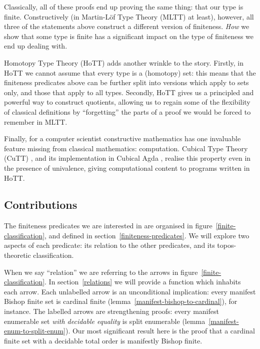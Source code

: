 Classically, all of these proofs end up proving the same thing: that our type is
finite.
Constructively (in Martin-Löf Type Theory (MLTT)
\cite{martin-lofIntuitionisticTypeTheory1980} at least), however, all three
of the statements above construct a different version of finiteness.
\emph{How} we show that some type is finite has a significant impact on the
type of finiteness we end up dealing with.

Homotopy Type Theory (HoTT) \cite{hottbook} adds another wrinkle to the story.
Firstly, in HoTT we cannot assume that every type is a (homotopy) set: this
means that the finiteness predicates above can be further split into versions
which apply to sets only, and those that apply to all types.
Secondly, HoTT gives us a principled and powerful way to construct quotients,
allowing us to regain some of the flexibility of classical definitions by
``forgetting'' the parts of a proof we would be forced to remember in MLTT.

Finally, for a computer scientist constructive mathematics has one invaluable
feature missing from classical mathematics: computation.
Cubical Type Theory (CuTT) \cite{cohenCubicalTypeTheory2016}, and its
implementation in Cubical Agda \cite{vezzosiCubicalAgdaDependently2019}, realise
this property even in the presence of univalence, giving computational content
to programs written in HoTT.
\subsection{Contributions}
The finiteness predicates we are interested in are organised in
figure~\ref{finite-classification}, and defined in
section~\ref{finiteness-predicates}.
We will explore two aspects of each predicate: its relation to the other
predicates, and its topos-theoretic classification.



When we say ``relation'' we are referring to the arrows in
figure~\ref{finite-classification}.
In section~\ref{relations} we will provide a function which inhabits each arrow.
Each unlabelled arrow is an unconditional implication: every manifest Bishop
finite set is cardinal finite (lemma~\ref{manifest-bishop-to-cardinal}), for
instance.
The labelled arrows are strengthening proofs: every manifest enumerable set
\emph{with decidable equality} is split enumerable
(lemma~\ref{manifest-enum-to-split-enum}).
Our most significant result here is the proof that a cardinal finite set with a
decidable total order is manifestly Bishop finite.

